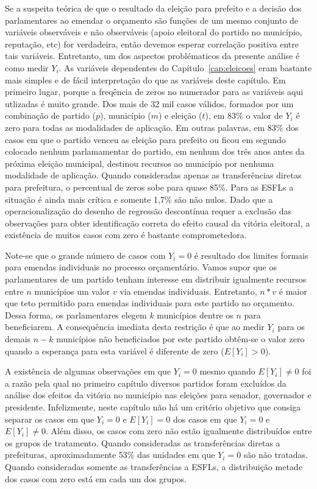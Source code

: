 Se a suspeita teórica de que o resultado da eleição para prefeito e a decisão dos parlamentares ao emendar o orçamento são funções de um mesmo conjunto de variáveis observáveis e não observáveis (apoio eleitoral do partido no município, reputação, etc) for verdadeira, então devemos esperar correlação positiva entre tais variáveis. Entretanto, um dos aspectos problématicos da presente análise é como medir $Y_{i}$. As variáveis dependentes do Capítulo~\ref{cap:eleicoes} eram bastante mais simples e de fácil interpretação do que as variáveis deste capítulo. Em primeiro lugar, porque a freqência de zeros no numerador para as variáveis aqui utlizadas é muito grande. Dos mais de 32 mil casos válidos, formados por um combinação de partido ($p$), município ($m$) e eleição ($t$), em 83\% o valor de $Y_{i}$ é zero para todas as modalidades de aplicação. Em outras palavras, em 83\% dos casos em que o partido venceu as eleição para prefeito ou ficou em segundo colocado nenhum parlamamentar do partido, em nenhum dos três anos antes da próxima eleição municipal, destinou recursos ao município por nenhuma modalidade de aplicação. Quando consideradas apenas as transferências diretas para prefeitura, o percentual de zeros sobe para quase 85\%. Para as ESFLs a situação é ainda mais crítica e somente 1,7\% são não nulos. Dado que a operacionalização do desenho de regressão descontínua requer a exclusão das observações para obter identificação correta do efeito causal da vitória eleitoral, a existência de muitos casos com zero é bastante comprometedora. 

Note-se que o grande número de casos com $Y_{i}=0$ é resultado dos limites formais para emendas individuais no processo orçamentário. Vamos supor que os parlamentares de um partido tenham interesse em distribuir igualmente recursos entre $n$ municípios um valor $v$ via emendas individuais. Entretanto, $n*v$ é maior que teto permitido para emendas individuais para este partido no orçamento. Dessa forma, os parlamentares elegem $k$ municípios dentre os $n$ para beneficiarem. A consequência imediata desta restrição é que ao medir $Y_{i}$ para os demais $n-k$ municípios não beneficiados por este partido obtêm-se o valor zero quando a esperança para esta variável é diferente de zero ($E[Y_{i}]>0$).

A existência de algumas observações em que $Y_{i}=0$ mesmo quando $E[Y_{i}] \ne 0$ foi a razão pela qual no primeiro capítulo diversos partidos foram excluídos da análise dos efeitos da vitória no município nas eleições para senador, governador e presidente. Infelizmente, neste capítulo não há um critério objetivo que consiga separar os casos em que $Y_{i}=0$ e $E[Y_{i}]=0$ dos casos em que $Y_{i}=0$ e $E[Y_{i}] \ne 0$. Além disso, os casos com zero não estão igualmente distribuídos entre os grupos de tratamento. Quando consideradas as transferências diretas a prefeituras, aproximadamente 53\% das unidades em que $Y_{i}=0$ são não tratadas. Quando consideradas somente as transferências a ESFLs, a distribuição metade dos casos com zero está em cada um dos grupos.


